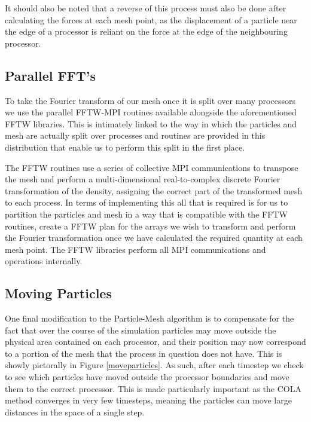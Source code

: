 \documentclass[5p,authoryear]{elsarticle}
\begin{document}
It should also be noted that a reverse of this process must also be done after calculating the forces at each mesh point, as the displacement of a particle near the edge of a processor is reliant on the force at the edge of the neighbouring processor.

\subsection{Parallel FFT's}

To take the Fourier transform of our mesh once it is split over many processors we use the parallel FFTW-MPI routines available alongside the aforementioned FFTW libraries. This is intimately linked to the way in which the particles and mesh are actually split over processes and routines are provided in this distribution that enable us to perform this split in the first place. 

The FFTW routines use a series of collective MPI communications to transpose the mesh and perform a multi-dimensional real-to-complex discrete Fourier transformation of the density, assigning the correct part of the transformed mesh to each process. In terms of implementing this all that is required is for us to partition the particles and mesh in a way that is compatible with the FFTW routines, create a FFTW plan for the arrays we wish to transform and perform the Fourier transformation once we have calculated the required quantity at each mesh point. The FFTW libraries perform all MPI communications and operations internally.

\subsection{Moving Particles}

One final modification to the Particle-Mesh algorithm is to compensate for the fact that over the course of the simulation particles may move outside the physical area contained on each processor, and their position may now correspond to a portion of the mesh that the process in question does not have. This is showly pictorally in Figure \ref{moveparticles}. As such, after each timestep we check to see which particles have moved outside the processor boundaries and move them to the correct processor. This is made particularly important as the COLA method converges in very few timesteps, meaning the particles can move large distances in the space of a single step. 
\end{document}
